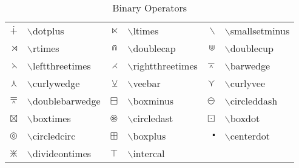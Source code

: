 \begin{table}
\centering
\caption{Binary Operators}
\vspace{\baselineskip}
\tablerule
\begin{tabular}{rlrlrl}
$\dotplus$&$\backslash$dotplus&
$\ltimes$&$\backslash$ltimes&
$\smallsetminus$&$\backslash$smallsetminus\\
$\rtimes$&$\backslash$rtimes&
$\doublecap$&$\backslash$doublecap&
$\doublecup$&$\backslash$doublecup\\
$\leftthreetimes$&$\backslash$leftthreetimes&
$\rightthreetimes$&$\backslash$rightthreetimes&
$\barwedge$&$\backslash$barwedge\\
$\curlywedge$&$\backslash$curlywedge&
$\veebar$&$\backslash$veebar&
$\curlyvee$&$\backslash$curlyvee\\
$\doublebarwedge$&$\backslash$doublebarwedge&
$\boxminus$&$\backslash$boxminus&
$\circleddash$&$\backslash$circleddash\\
$\boxtimes$&$\backslash$boxtimes&
$\circledast$&$\backslash$circledast&
$\boxdot$&$\backslash$boxdot\\
$\circledcirc$&$\backslash$circledcirc&
$\boxplus$&$\backslash$boxplus&
$\centerdot$&$\backslash$centerdot\\
$\divideontimes$&$\backslash$divideontimes&
$\intercal$&$\backslash$intercal&\\
\end{tabular}
\tablerule
\end{table}
 
